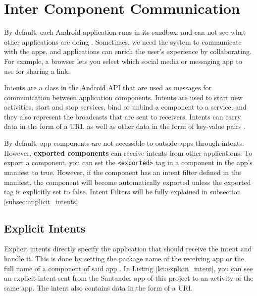     
    
    \section{Inter Component Communication}
        \label{sec:inter_component_communication}
    
    By default, each Android application runs in its sandbox, and can not see what other applications are doing \cite{android_app_fundamentals}. Sometimes, we need the system to communicate with the apps, and applications can enrich the user's experience by collaborating. For example, a browser lets you select which social media or messaging app to use for sharing a link.
    
    Intents are a class in the Android API that are used as messages for communication between application components. Intents are used to start new activities, start and stop services, bind or unbind a component to a service, and they also represent the broadcasts that are sent to receivers. Intents can carry data in the form of a URI, as well as other data in the form of key-value pairs \cite{intents}.
        
    By default, app components are not accessible to outside apps through intents. However, \textbf{exported components} can receive intents from other applications. To export a component, you can set the \lstinline|<exported>| tag in a component in the app’s manifest to true. However, if the component has an intent filter defined in the manifest, the component will become automatically exported unless the exported tag is explicitly set to false. Intent Filters will be fully explained in subsection \ref{subsec:implicit_intents}.
    
    \subsection{Explicit Intents}
        \label{subsec:explicit_intents}
        
    Explicit intents directly specify the application that should receive the intent and handle it. This is done by setting the package name of the receiving app or the full name of a component of said app \cite{intents_and_intent_filters}. In Listing \ref{lst:explicit_intent}, you can see an explicit intent sent from the Santander app of this project to an activity of the same app. The intent also contains data in the form of a URI.
    
